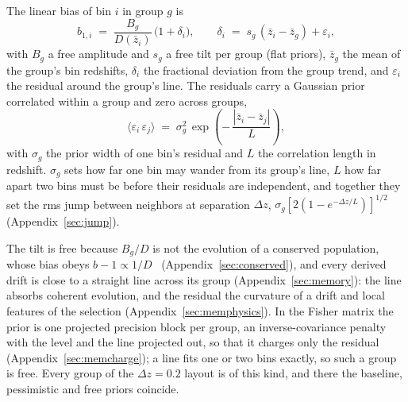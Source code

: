 \documentclass[11pt]{article}
\begin{document}
The linear bias of bin $i$ in group $g$ is
\begin{equation}
  b_{1,i} \;=\; \frac{B_g}{D(\bar{z}_i)}\,\bigl(1 + \delta_i\bigr),
  \qquad
  \delta_i \;=\; s_g\,(\bar{z}_i - \bar{z}_g) + \varepsilon_i ,
  \label{eq:summodel}
\end{equation}
with $B_g$ a free amplitude and $s_g$ a free tilt per group (flat
priors), $\bar{z}_g$ the mean of the group's bin redshifts, $\delta_i$
the fractional deviation from the group trend, and $\varepsilon_i$ the
residual around the group's line.  The residuals carry a Gaussian
prior correlated within a group and zero across groups,
\begin{equation}
  \bigl\langle \varepsilon_i\,\varepsilon_j \bigr\rangle
  \;=\; \sigma_g^2\,
  \exp\!\left(-\,\frac{|\bar{z}_i - \bar{z}_j|}{L}\right),
  \label{eq:sumkernel}
\end{equation}
with $\sigma_g$ the prior width of one bin's residual and $L$ the
correlation length in redshift.  $\sigma_g$ sets how far one bin may
wander from its group's line, $L$ how far apart two bins must be
before their residuals are independent, and together they set the rms
jump between neighbors at separation $\Delta z$,
$\sigma_g[2(1 - e^{-\Delta z/L})]^{1/2}$ (Appendix~\ref{sec:jump}).

The tilt is free because $B_g/D$ is not the evolution of a conserved
population, whose bias obeys $b - 1 \propto 1/D$~\cite{Fry1996}
(Appendix~\ref{sec:conserved}), and every derived drift is close to a
straight line across its group (Appendix~\ref{sec:memory}): the line
absorbs coherent evolution, and the residual the curvature of a drift
and local features of the selection (Appendix~\ref{sec:memphysics}).
In the Fisher matrix the prior is one projected precision block per
group, an inverse-covariance penalty with the level and the line
projected out, so that it charges only the residual
(Appendix~\ref{sec:memcharge}); a line fits one or two bins exactly,
so such a group is free.  Every group of the
$\Delta z = 0.2$ layout is of this kind, and there the baseline,
pessimistic and free priors coincide.
\end{document}
